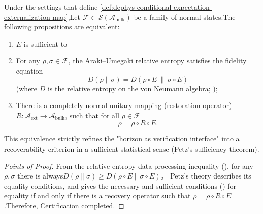 \begin{theorem}\label{thm:dephys-petz-sufficiency-equivalences}Under the settings that define \ref{def:dephys-conditional-expectation-externalization-map},Let \(\mathcal{F}\subset\mathcal{S}(\mathcal{A}_{\mathrm{bulk}})\) be a family of normal states.The following propositions are equivalent:\begin{enumerate}
\item[(i)] \(E\) is sufficient to\item[(ii)] For any \(\rho,\sigma\in\mathcal{F}\), the Araki--Umegaki relative entropy satisfies the fidelity equation  \begin{equation}\label{eq:dephys-relative-entropy-sufficiency-equality}
  \boxed{\;
  D(\rho\|\sigma)=D(\rho\circ E\ \|\ \sigma\circ E)\;}
  \end{equation}
(where \(D\) is the relative entropy on the von Neumann algebra; \cite{Araki1976RelativeEntropyVonNeumann});\item[(iii)] There is a completely normal unitary mapping (restoration operator) \(R:\mathcal{A}_{\mathrm{ext}}\to\mathcal{A}_{\mathrm{bulk}}\), such that for all \(\rho\in\mathcal{F}\)  \begin{equation}\label{eq:dephys-recovery-map-identity-on-family}
  \boxed{\;
  \rho=\rho\circ R\circ E.\;}
  \end{equation}
\end{enumerate}
This equivalence strictly refines the "horizon as verification interface" into a recoverability criterion in a sufficient statistical sense (Petz's sufficiency theorem).\end{theorem}

\begin{proof}[Points of Proof]From the relative entropy data processing inequality (\cite{Petz2003MonotonicityRelativeEntropyRevisited}), for any \(\rho,\sigma\) there is always\(
D(\rho\|\sigma)\ge D(\rho\circ E\|\sigma\circ E)
\)。
Petz's theory describes its equality conditions, and gives the necessary and sufficient conditions (\cite{Petz1986SufficientSubalgebrasRelativeEntropy}) for equality if and only if there is a recovery operator such that \(\rho=\rho\circ R\circ E\).Therefore, Certification completed.\end{proof}

